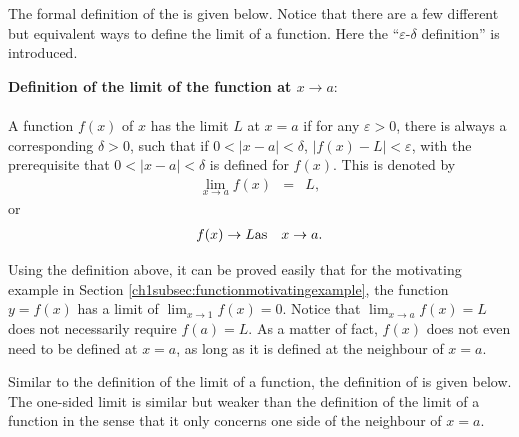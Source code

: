 The formal definition of the  is given below. Notice that there are a few different but equivalent ways to define the limit of a function. Here the ``$\varepsilon$-$\delta$ definition'' is introduced.

\begin{mdframed}
\textbf{Definition of the limit of the function at $x\rightarrow a$}:
\\
\\
\noindent A function $f(x)$ of $x$ has the limit $L$ at $x=a$ if for any $\varepsilon > 0$, there is always a corresponding $\delta > 0$, such that if $0<|x-a|<\delta$, $|f(x)-L| < \varepsilon$, with the prerequisite that $0<|x-a|<\delta$ is defined for $f(x)$. This is denoted by
\begin{eqnarray}
   \lim_{x\rightarrow a} f(x) &=& L, \nonumber
\end{eqnarray}
or
\begin{eqnarray}
  f(x) \rightarrow L & \textup{as} & x \rightarrow a. \nonumber
\end{eqnarray}
\end{mdframed}

Using the definition above, it can be proved easily that for the motivating example in Section \ref{ch1subsec:functionmotivatingexample}, the function $y=f(x)$ has a limit of $\lim_{x\rightarrow 1}f(x)=0$. Notice that $\lim_{x\rightarrow a}f(x)=L$ does not necessarily require $f(a)=L$. As a matter of fact, $f(x)$ does not even need to be defined at $x=a$, as long as it is defined at the neighbour of $x=a$.

Similar to the definition of the limit of a function, the definition of  is given below. The one-sided limit is similar but weaker than the definition of the limit of a function in the sense that it only concerns one side of the neighbour of $x=a$.

